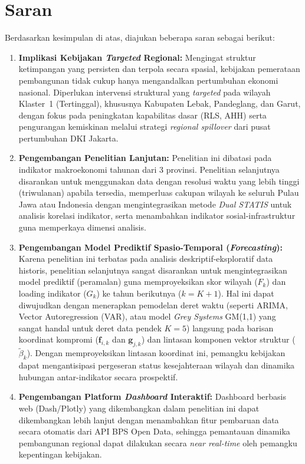 \section{\normalsize Saran}
Berdasarkan kesimpulan di atas, diajukan beberapa saran sebagai berikut:

\begin{enumerate}
    \item \textbf{Implikasi Kebijakan \textit{Targeted} Regional:}
    Mengingat struktur ketimpangan yang persisten dan terpola secara spasial, kebijakan pemerataan pembangunan tidak cukup hanya mengandalkan pertumbuhan ekonomi nasional. Diperlukan intervensi struktural yang \textit{targeted} pada wilayah Klaster~1 (Tertinggal), khususnya Kabupaten Lebak, Pandeglang, dan Garut, dengan fokus pada peningkatan kapabilitas dasar (RLS, AHH) serta pengurangan kemiskinan melalui strategi \textit{regional spillover} dari pusat pertumbuhan DKI Jakarta.
    
    \item \textbf{Pengembangan Penelitian Lanjutan:}
    Penelitian ini dibatasi pada indikator makroekonomi tahunan dari 3 provinsi. Penelitian selanjutnya disarankan untuk menggunakan data dengan resolusi waktu yang lebih tinggi (triwulanan) apabila tersedia, memperluas cakupan wilayah ke seluruh Pulau Jawa atau Indonesia dengan mengintegrasikan metode \textit{Dual STATIS} untuk analisis korelasi indikator, serta menambahkan indikator sosial-infrastruktur guna memperkaya dimensi analisis.

    \item \textbf{Pengembangan Model Prediktif Spasio-Temporal (\textit{Forecasting}):}
    Karena penelitian ini terbatas pada analisis deskriptif-eksploratif data historis, penelitian selanjutnya sangat disarankan untuk mengintegrasikan model prediktif (peramalan) guna memproyeksikan skor wilayah ($F_k$) dan loading indikator ($G_k$) ke tahun berikutnya ($k = K+1$). Hal ini dapat diwujudkan dengan menerapkan pemodelan deret waktu (seperti ARIMA, Vector Autoregression (VAR), atau model \textit{Grey Systems} GM(1,1) yang sangat handal untuk deret data pendek $K=5$) langsung pada barisan koordinat kompromi ($\mathbf{f}_{i,k}$ dan $\mathbf{g}_{j,k}$) dan lintasan komponen vektor struktur ($\tilde{\beta}_k$). Dengan memproyeksikan lintasan koordinat ini, pemangku kebijakan dapat mengantisipasi pergeseran status kesejahteraan wilayah dan dinamika hubungan antar-indikator secara prospektif.

    \item \textbf{Pengembangan Platform \textit{Dashboard} Interaktif:}
    Dashboard berbasis web (Dash/Plotly) yang dikembangkan dalam penelitian ini dapat dikembangkan lebih lanjut dengan menambahkan fitur pembaruan data secara otomatis dari API BPS Open Data, sehingga pemantauan dinamika pembangunan regional dapat dilakukan secara \textit{near real-time} oleh pemangku kepentingan kebijakan.
\end{enumerate}

